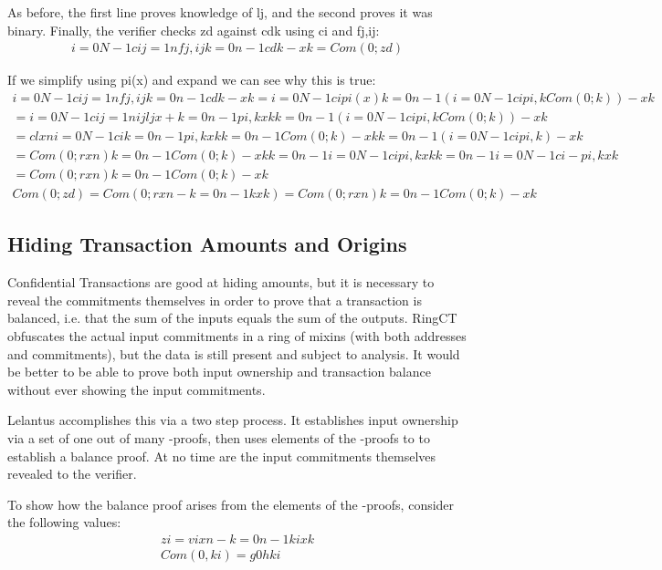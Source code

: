 \documentclass{article}
\begin{document}
As before, the first line proves knowledge of lj, and the second proves it was binary.  Finally, the verifier checks zd against cdk using ci and fj,ij:
\begin{eqnarray}
  i=0N-1cij=1nfj,ij  k=0n-1cdk-xk=Com(0;zd)
\end{eqnarray}

If we simplify using pi(x) and expand we can see why this is true:
\begin{eqnarray}
  i=0N-1cij=1nfj,ij  k=0n-1cdk-xk=i=0N-1cipi(x)  k=0n-1 (i=0N-1cipi,k Com(0;k))-xk\\
  =i=0N-1cij=1nijljx+ k=0n-1pi,k xk  k=0n-1 (i=0N-1cipi,k Com(0;k))-xk\\
  =clxn i=0N-1cik=0n-1pi,k xk  k=0n-1Com(0;k)-xk k=0n-1(i=0N-1cipi,k)-xk\\
  =Com(0;rxn) k=0n-1Com(0;k)-xk  k=0n-1i=0N-1cipi,k xk  k=0n-1i=0N-1ci-pi,kxk\\
  =Com(0;rxn) k=0n-1Com(0;k)-xk\\
  Com(0;zd)=Com(0;rxn-k=0n-1kxk)=Com(0;rxn) k=0n-1Com(0;k)-xk
\end{eqnarray}


\subsection{Hiding Transaction Amounts and Origins}
 
Confidential Transactions are good at hiding amounts, but it is necessary to reveal the commitments themselves in order to prove that a transaction is balanced, i.e. that the sum of the inputs equals the sum of the outputs.  RingCT obfuscates the actual input commitments in a ring of mixins (with both addresses and commitments), but the data is still present and subject to analysis.  It would be better to be able to prove both input ownership and transaction balance without ever showing the input commitments.

Lelantus accomplishes this via a two step process.  It establishes input ownership via a set of one out of many -proofs, then uses elements of the -proofs to to establish a balance proof.  At no time are the input commitments themselves revealed to the verifier.

To show how the balance proof arises from the elements of the -proofs, consider the following values:
\begin{eqnarray}
  zi=vixn-k=0n-1kixk\\
  Com(0,ki)=g0hki
\end{eqnarray}
\end{document}
